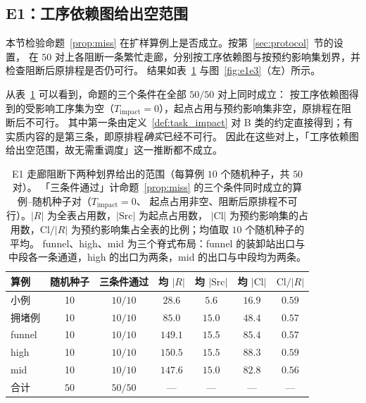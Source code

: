\documentclass[manuscript,screen,review]{acmart}
\newcommand{\NSeeds}{10}
\newcommand{\NPairs}{50}
\newcommand{\PassMiss}{\NPairs/\NPairs}      %
\begin{document}
\subsection{E1：工序依赖图给出空范围}
\label{sec:e1}

本节检验命题~\ref{prop:miss} 在扩样算例上是否成立。按第~\ref{sec:protocol}~节的设置，
在 \(\NPairs\) 对上各阻断一条繁忙走廊，分别按工序依赖图与按预约影响集划界，并检查阻断后原排程是否仍可行。
结果如表~\ref{tab:e1} 与图~\ref{fig:e1e3}（左）所示。

从表~\ref{tab:e1} 可以看到，命题的三个条件在全部 \(\PassMiss\) 对上同时成立：
按工序依赖图得到的受影响工序集为空（\(T_{\mathrm{impact}}=0\)），起点占用与预约影响集非空，原排程在阻断后不可行。
其中第一条由定义~\ref{def:task_impact} 对 B 类的约定直接得到；有实质内容的是第三条，即原排程\emph{确实}已经不可行。
因此在这些对上，「工序依赖图给出空范围，故无需重调度」这一推断都不成立。

\begin{table}[t]
\centering
\caption{E1 走廊阻断下两种划界给出的范围（每算例 \(\NSeeds\) 个随机种子，共 \(\NPairs\) 对）。
「三条件通过」计命题~\ref{prop:miss} 的三个条件同时成立的算例--随机种子对（\(T_{\mathrm{impact}}=0\)、
起点占用非空、阻断后原排程不可行）。\(|R|\) 为全表占用数，\(|\mathrm{Src}|\) 为起点占用数，
\(|\mathrm{Cl}|\) 为预约影响集的占用数，\(\mathrm{Cl}/|R|\) 为预约影响集占全表的比例；均值取 \(\NSeeds\) 个随机种子的平均。
funnel、high、mid 为三个脊式布局：funnel 的装卸站出口与中段各一条通道，high 的出口为两条，mid 的出口与中段均为两条。}
\label{tab:e1}
\small
\begin{tabular}{@{}lcccccc@{}}
\toprule
算例 & 随机种子 & 三条件通过 & 均 \(|R|\) & 均 \(|\mathrm{Src}|\)
 & 均 \(|\mathrm{Cl}|\) & \(\mathrm{Cl}/|R|\) \\
\midrule
小例   & 10 & \(10/10\) & \(28.6\)  & \(5.6\)  & \(16.9\) & \(0.59\) \\
拥堵例 & 10 & \(10/10\) & \(85.0\)  & \(15.0\) & \(48.4\) & \(0.57\) \\
funnel  & 10 & \(10/10\) & \(149.1\) & \(15.5\) & \(85.4\) & \(0.57\) \\
high    & 10 & \(10/10\) & \(150.5\) & \(15.5\) & \(88.3\) & \(0.59\) \\
mid     & 10 & \(10/10\) & \(147.6\) & \(15.0\) & \(82.8\) & \(0.56\) \\
\midrule
合计 & \(\NPairs\) & \(\PassMiss\) & --- & --- & --- & --- \\
\bottomrule
\end{tabular}
\end{table}
\end{document}
